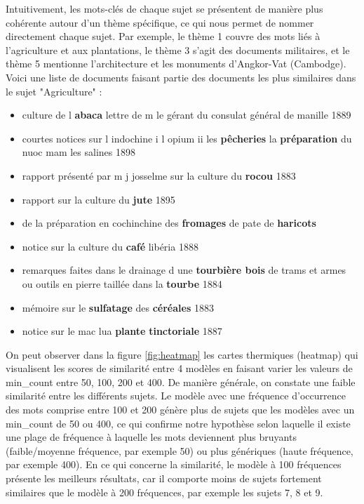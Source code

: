 Intuitivement, les mots-clés de chaque sujet se présentent de manière plus cohérente autour d'un thème spécifique, ce qui nous permet de nommer directement chaque sujet. Par exemple, le thème 1 couvre des mots liés à l'agriculture et aux plantations, le thème 3 s'agit des documents militaires, et le thème 5 mentionne l'architecture et les monuments d'Angkor-Vat (Cambodge). Voici une liste de documents faisant partie des documents les plus similaires dans le sujet "Agriculture" :
\begin{itemize}
    \item culture de l \textbf{abaca} lettre de m le gérant du consulat général de manille 1889
    \item courtes notices sur l indochine i l opium ii les \textbf{pêcheries} la \textbf{préparation} du nuoc mam les salines 1898
    \item rapport présenté par m j josselme sur la culture du \textbf{rocou} 1883 
    \item rapport sur la culture du \textbf{jute} 1895 
    \item de la préparation en cochinchine des \textbf{fromages} de pate de \textbf{haricots} \item notice sur la culture du \textbf{café} libéria 1888
    \item remarques faites dans le drainage d une \textbf{tourbière bois} de trams et armes ou outils en pierre taillée dans la \textbf{tourbe} 1884 
    \item mémoire sur le \textbf{sulfatage} des \textbf{céréales} 1883
    \item notice sur le mac lua \textbf{plante} \textbf{tinctoriale} 1887 
\end{itemize}


On peut observer dans la figure \ref{fig:heatmap} les cartes thermiques (heatmap) qui visualisent les scores de similarité entre 4 modèles en faisant varier les valeurs de min\_count entre 50, 100, 200 et 400. De manière générale, on constate une faible similarité entre les différents sujets. Le modèle avec une fréquence d'occurrence des mots comprise entre 100 et 200 génère plus de sujets que les modèles avec un min\_count de 50 ou 400, ce qui confirme notre hypothèse selon laquelle il existe une plage de fréquence à laquelle les mots deviennent plus bruyants (faible/moyenne fréquence, par exemple 50) ou plus génériques (haute fréquence, par exemple 400). En ce qui concerne la similarité, le modèle à 100 fréquences présente les meilleurs résultats, car il comporte moins de sujets fortement similaires que le modèle à 200 fréquences, par exemple les sujets 7, 8 et 9.

